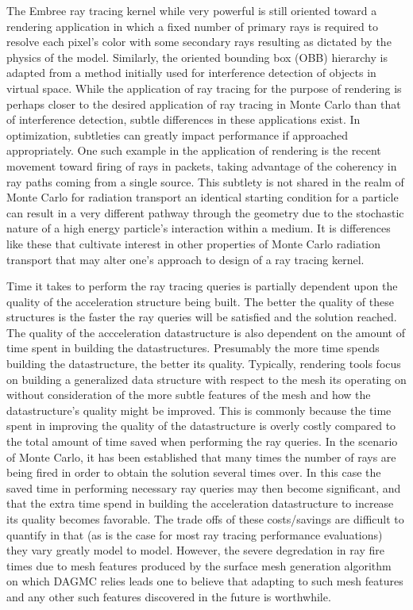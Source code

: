 \documentclass[12pt, a4paper]{article}
\begin{document}
The Embree ray tracing kernel while very powerful is still oriented toward a rendering application in which a fixed number of primary rays is required to resolve each pixel's color with some secondary rays resulting as dictated by the physics of the model. Similarly, the oriented bounding box (OBB) hierarchy is adapted from a method initially used for interference detection of objects in virtual space. While the application of ray tracing for the purpose of rendering is perhaps closer to the desired application of ray tracing in Monte Carlo than that of interference detection, subtle differences in these applications exist. In optimization, subtleties can greatly impact performance if approached appropriately. One such example in the application of rendering is the recent movement toward firing of rays in packets, taking advantage of the coherency in ray paths coming from a single source. This subtlety is not shared in the realm of Monte Carlo for radiation transport an identical starting condition for a particle can result in a very different pathway through the geometry due to the stochastic nature of a high energy particle's interaction within a medium. It is differences like these that cultivate interest in other properties of Monte Carlo radiation transport that may alter one's approach to design of a ray tracing kernel.

Time it takes to perform the ray tracing queries is partially dependent upon the quality of the acceleration structure being built. The better the quality of these structures is the faster the ray queries will be satisfied and the solution reached. The quality of the accceleration datastructure is also dependent on the amount of time spent in building the datastructures. Presumably the more time spends building the datastructure, the better its quality. Typically, rendering tools focus on building a generalized data structure with respect to the mesh its operating on without consideration of the more subtle features of the mesh and how the datastructure's quality might be improved. This is commonly because the time spent in improving the quality of the datastructure is overly costly compared to the total amount of time saved when performing the ray queries. In the scenario of Monte Carlo, it has been established that many times the number of rays are being fired in order to obtain the solution several times over. In this case the saved time in performing necessary ray queries may then become significant, and that the extra time spend in building the acceleration datastructure to increase its quality becomes favorable. The trade offs of these costs/savings are difficult to quantify in that (as is the case for most ray tracing performance evaluations) they vary greatly model to model. However, the severe degredation in ray fire times due to mesh features produced by the surface mesh generation algorithm on which DAGMC relies leads one to believe that adapting to such mesh features and any other such features discovered in the future is worthwhile.
\end{document}
